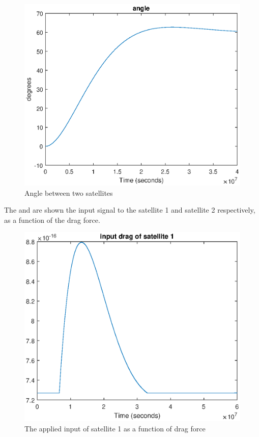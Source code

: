 \begin{figure}[H]
	\centering
	\includegraphics[width=0.9\linewidth]
	{figures/newangle.eps}
	\caption{Angle between two satellites }
	\label{fig:distancecontrol2}
\end{figure}
%
The  and  are shown the input signal to the satellite 1 and satellite 2 respectively, as a function of the drag force. 
%
\begin{figure}[H]
	\centering
	\includegraphics[width=0.9\linewidth]
	{figures/input_drag_sat1.eps}
	\caption{The applied input of satellite 1 as a function of drag force  }
	\label{fig:distancecontrol3}
\end{figure}
